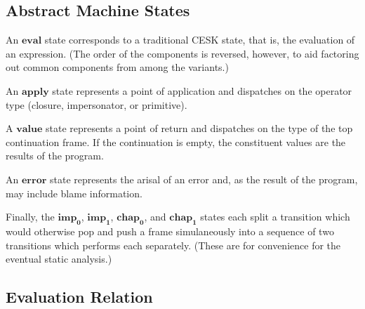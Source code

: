 \subsection{Abstract Machine States}

An $\mathbf{eval}$ state corresponds to a traditional CESK state, that is, the evaluation of an expression.
(The order of the components is reversed, however, to aid factoring out common components from among the variants.)

An $\mathbf{apply}$ state represents a point of application and dispatches on the operator type (closure, impersonator, or primitive).

A $\mathbf{value}$ state represents a point of return and dispatches on the type of the top continuation frame.
If the continuation is empty, the constituent values are the results of the program.

An $\mathbf{error}$ state represents the arisal of an error and, as the result of the program, may include blame information.

Finally, the $\mathbf{imp_0}$, $\mathbf{imp_1}$, $\mathbf{chap_0}$, and $\mathbf{chap_1}$ states each split a transition which would otherwise pop and push a frame simulaneously into a sequence of two transitions which performs each separately.
(These are for convenience for the eventual static analysis.)

\subsection{Evaluation Relation}










